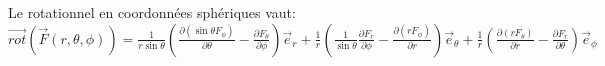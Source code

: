 \documentclass{article}
\begin{document}
Le rotationnel en coordonnées sphériques vaut:\\


$\vec{rot}(\vec{F}(r, \theta, \phi)) = \frac{1}{r \sin \theta} \left(\frac{\partial(\sin \theta F_\phi)}{\partial \theta} - \frac{\partial F_\theta}{\partial \phi}\right) \vec{e}_r + \frac{1}{r} \left(\frac{1}{\sin \theta} \frac{\partial F_r}{\partial \phi} - \frac{\partial(r F_{\phi})}{\partial r}\right) \vec{e}_\theta + \frac{1}{r} \left(\frac{\partial(rF_\theta)}{\partial r} - \frac{\partial F_r}{\partial \theta}\right) \vec{e}_\phi
$
\end{document}
